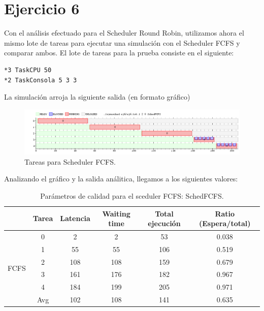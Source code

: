 \section{Ejercicio 6}

Con el análisis efectuado para el Scheduler Round Robin, utilizamos ahora el mismo lote de tareas para ejecutar una simulación con el Scheduler FCFS y comparar ambos.
El lote de tareas para la prueba consiste en el siguiente:

\begin{verbatim}
*3 TaskCPU 50 
*2 TaskConsola 5 3 3
\end{verbatim}

La simulación arroja la siguiente salida (en formato gráfico)
\begin{figure}[h]
  \includegraphics[width=\textwidth]{../ej6/ej6FCFS120.png}
  \caption{Tareas para Scheduler FCFS.}
  \label{fig:quant2}
\end{figure}

Analizando el gráfico y la salida análitica, llegamos a los siguientes valores:

\begin{table}[h!]
 	\begin{center}
 		\caption{Parámetros de calidad para el sceduler FCFS: SchedFCFS.}
 		\label{tab:table2}
 		\begin{tabular}{|l|c|c|c|c|c|}
 			\hline
 			& Tarea & Latencia & Waiting time & Total ejecución & Ratio (Espera/total) \\
 			\hline
 			\hline
 			\multirow{6}{*}{FCFS}
 			& 0 & 2 & 2 & 53 & 0.038 \\ \cline{2-6}
 			& 1 & 55 & 55 & 106 & 0.519 \\ \cline{2-6}
 			& 2 & 108 & 108 & 159 & 0.679 \\ \cline{2-6}
 			& 3 & 161 & 176 & 182 & 0.967 \\ \cline{2-6}
 			& 4 & 184 & 199 & 205 & 0.971 \\ \cline{2-6}
 			& Avg & 102 & 108 & 141 & 0.635 \\
 			\hline
 			
 		\end{tabular}
 	\end{center}
 \end{table}
 

